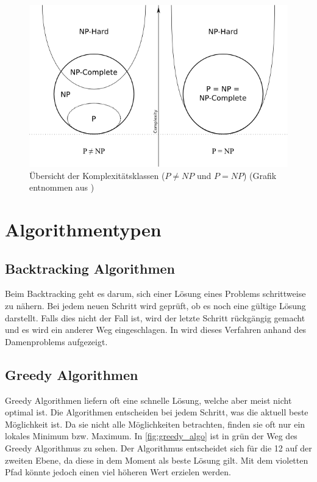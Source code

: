 \begin{figure}[h]
\includegraphics[scale=0.65]{images/einleitung/p_np_np-complete_np-hard.png}
\caption[Übersicht der Komplexitätsklassen ($P!=NP$ und $P=NP$)]{Übersicht der Komplexitätsklassen ($P \neq NP$ und $P=NP$) (Grafik entnommen aus \cite{pic_p_np})}
\label{fig:complexity_overview}
\end{figure}

\section{Algorithmentypen}\label{algo_types}

\subsection{Backtracking Algorithmen}\label{backtracking_algos}
Beim Backtracking geht es darum, sich einer Lösung eines Problems schrittweise zu nähern. Bei jedem neuen Schritt wird geprüft, ob es noch eine gültige Lösung darstellt. Falls dies nicht der 
Fall ist, wird der letzte Schritt rückgängig gemacht und es wird ein anderer Weg eingeschlagen. In \cite{backtracking} wird dieses Verfahren anhand des Damenproblems aufgezeigt.

\subsection{Greedy Algorithmen}\label{greedy_algos}
Greedy Algorithmen liefern oft eine schnelle Lösung, welche aber meist nicht optimal ist. Die Algorithmen entscheiden bei jedem Schritt, was die aktuell beste Möglichkeit ist. Da sie nicht alle 
Möglichkeiten betrachten, finden sie oft nur ein lokales Minimum bzw. Maximum. In \autoref{fig:greedy_algo} ist in grün der Weg des Greedy Algorithmus zu sehen. Der Algorithmus entscheidet 
sich für die 12 auf der zweiten Ebene, da diese in dem Moment als beste Lösung gilt. Mit dem violetten Pfad könnte jedoch einen viel höheren Wert erzielen werden.

